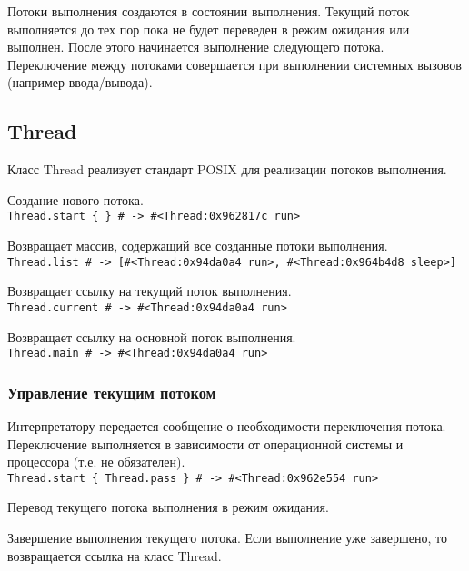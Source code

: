 Потоки выполнения создаются в состоянии выполнения. Текущий поток выполняется до тех пор пока не будет переведен в режим ожидания или выполнен. После этого начинается выполнение следующего потока. Переключение между потоками совершается при выполнении системных вызовов (например ввода/вывода). 

\subsection{Thread}

Класс Thread реализует стандарт POSIX для реализации потоков выполнения.

\begin{methodlist}
  Создание нового потока.
  \\\verb!Thread.start { } # -> #<Thread:0x962817c run>!

  Возвращает массив, содержащий все созданные потоки выполнения. 
  \\\verb!Thread.list # -> [#<Thread:0x94da0a4 run>, #<Thread:0x964b4d8 sleep>]!

  Возвращает ссылку на текущий поток выполнения. 
  \\\verb!Thread.current # -> #<Thread:0x94da0a4 run>!
 
  Возвращает ссылку на основной поток выполнения. 
  \\\verb!Thread.main # -> #<Thread:0x94da0a4 run>!
\end{methodlist}

\subsubsection*{Управление текущим потоком}

\begin{methodlist}
  Интерпретатору передается сообщение о необходимости переключения потока. Переключение выполняется в зависимости от операционной системы и процессора (т.е. не обязателен). 
  \\\verb!Thread.start { Thread.pass } # -> #<Thread:0x962e554 run>!

  Перевод текущего потока выполнения в режим ожидания.

  Завершение выполнения текущего потока. Если выполнение уже завершено, то возвращается ссылка на класс Thread.
\end{methodlist}

